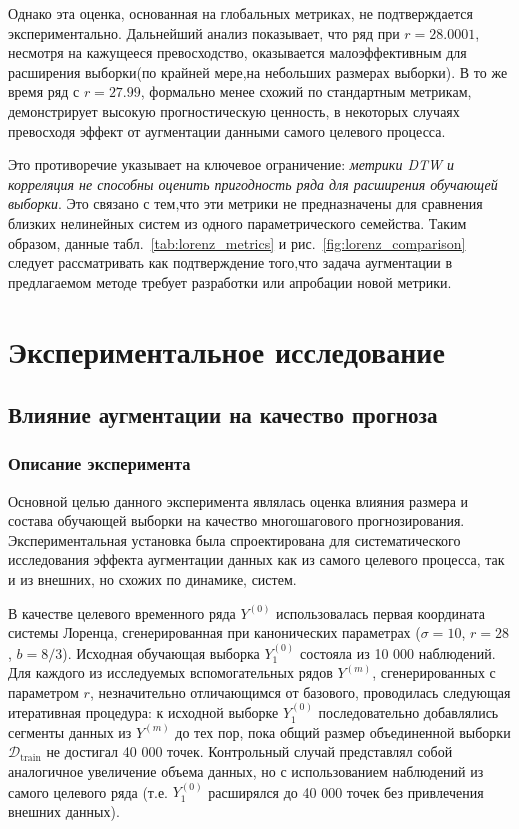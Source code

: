 \documentclass[a4paper,12pt]{extarticle}
\begin{document}
Однако эта оценка, основанная на глобальных метриках, не подтверждается экспериментально.
 Дальнейший анализ показывает, что ряд при \(r=28.0001\), несмотря на кажущееся превосходство, 
 оказывается малоэффективным для расширения выборки(по крайней мере,на небольших размерах выборки).
  В то же время ряд с \(r=27.99\), формально 
 менее схожий по стандартным метрикам, демонстрирует высокую прогностическую ценность,
  в некоторых случаях превосходя эффект 
 от аугментации данными самого целевого процесса.

Это противоречие указывает на ключевое ограничение: \textit{метрики DTW и корреляция не
 способны оценить пригодность ряда для расширения обучающей выборки}. 
Это связано с тем,что эти метрики не предназначены для сравнения 
близких нелинейных систем из одного параметрического семейства.
Таким образом, данные табл.~\ref{tab:lorenz_metrics} и рис.~\ref{fig:lorenz_comparison} 
следует рассматривать как подтверждение того,что задача аугментации в предлагаемом методе 
требует разработки или апробации новой метрики.

\section{Экспериментальное исследование}

\subsection{Влияние аугментации на качество прогноза}
\subsubsection{Описание эксперимента}
Основной целью данного эксперимента являлась оценка влияния размера и
состава обучающей выборки на качество многошагового прогнозирования. Экспериментальная
 установка была спроектирована для систематического исследования эффекта аугментации данных
  как из самого целевого процесса, так и из внешних, но схожих по динамике, систем.

В качестве целевого временного ряда $Y^{(0)}$ использовалась первая координата
 системы Лоренца, сгенерированная при канонических параметрах ($\sigma = 10$, $r = 28$, $b = 8/3$).
 Исходная обучающая выборка $Y_1^{(0)}$ состояла из 10 000 наблюдений. Для каждого из исследуемых
  вспомогательных рядов $Y^{(m)}$, сгенерированных с параметром $r$, незначительно отличающимся от
   базового, проводилась следующая итеративная процедура: к исходной выборке $Y_1^{(0)}$
   последовательно добавлялись сегменты данных из $Y^{(m)}$ до тех пор, пока общий размер
   объединенной выборки $\mathcal{D}_{\text{train}}$ не достигал 40 000 точек. Контрольный
   случай представлял собой аналогичное увеличение объема данных, но с использованием наблюдений
    из самого целевого ряда (т.е. $Y_1^{(0)}$ расширялся до 40 000 точек без привлечения внешних данных).
\end{document}
